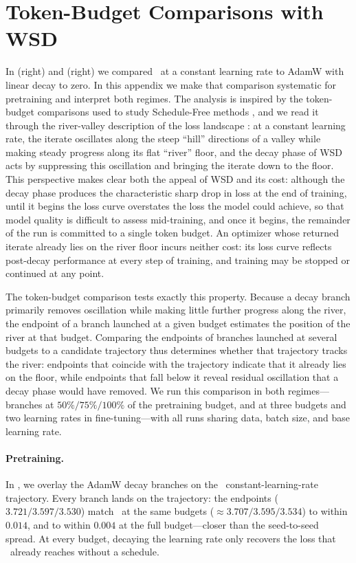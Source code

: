 \section{Token-Budget Comparisons with WSD}
\label{sec:app-river}

In  (right) and  (right) we compared
\pace\ at a constant learning rate to AdamW with linear decay to zero. In this
appendix we make that comparison systematic for pretraining and interpret both
regimes. The analysis is inspired by the token-budget comparisons used to
study Schedule-Free methods \citep{defazio2024schedule,song2025river}, and we
read it through the river-valley description of the loss landscape
\citep{wen2024warmup,song2025river}: at a constant learning rate, the iterate
oscillates along the steep ``hill'' directions of a valley while making steady
progress along its flat ``river'' floor, and the decay phase of WSD acts by
suppressing this oscillation and bringing the iterate down to the floor. This
perspective makes clear both the appeal of WSD and its cost: although the
decay phase produces the characteristic sharp drop in loss at the end of
training, until it begins the loss curve overstates the loss the model could
achieve, so that model quality is difficult to assess mid-training, and once
it begins, the remainder of the run is committed to a single token budget. An
optimizer whose returned iterate already lies on the river floor incurs
neither cost: its loss curve reflects post-decay performance at every step of
training, and training may be stopped or continued at any point.

The token-budget comparison tests exactly this property. Because a decay
branch primarily removes oscillation while making little further progress
along the river, the endpoint of a branch launched at a given budget estimates
the position of the river at that budget. Comparing the endpoints of branches
launched at several budgets to a candidate trajectory thus determines whether
that trajectory tracks the river: endpoints that coincide with the trajectory
indicate that it already lies on the floor, while endpoints that fall below it
reveal residual oscillation that a decay phase would have removed. We run
this comparison in both regimes---branches at $50\%/75\%/100\%$ of the
pretraining budget, and at three budgets and two learning rates in
fine-tuning---with all runs sharing data, batch size, and base learning rate.

\paragraph{Pretraining.}
In , we overlay the AdamW decay branches on
the \pace\ constant-learning-rate trajectory. Every branch lands on the
trajectory: the endpoints ($3.721/3.597/3.530$) match \pace\ at the same budgets
($\approx 3.707/3.595/3.534$) to within $0.014$, and to within $0.004$ at the
full budget---closer than the seed-to-seed spread. At every budget, decaying the
learning rate only recovers the loss that \pace\ already reaches without a
schedule.

